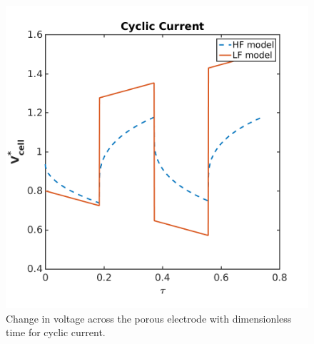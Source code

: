 \documentclass[]{article}
\begin{document}
\begin{figure}[h]
    \centering
    \includegraphics[trim = 0in 0in 0in 0in, clip, width=1.1\textwidth]{figures/Vcell_cycl.png}      
    \caption{Change in voltage across the porous electrode with dimensionless time for cyclic current.}
    \label{fig:Vcell_cycl}
\end{figure}


\clearpage

%
\end{document}
